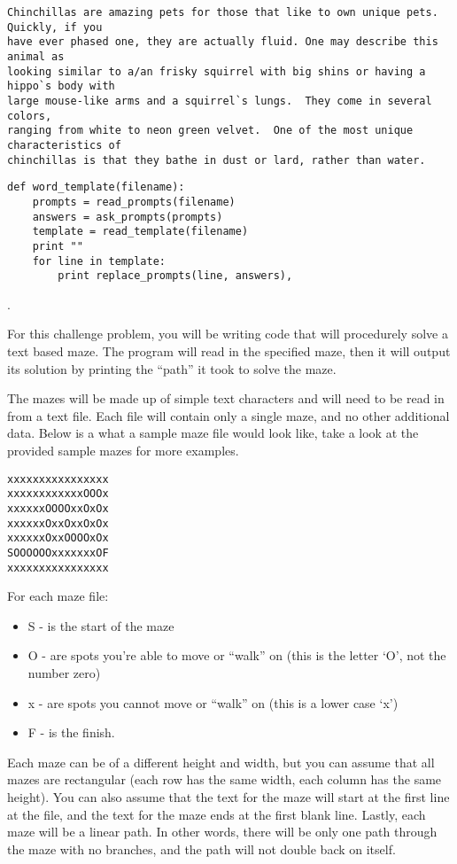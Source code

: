 \documentclass[10pt,answers]{exam}
\begin{document}
\begin{questions}
\begin{lstlisting}
Chinchillas are amazing pets for those that like to own unique pets. Quickly, if you 
have ever phased one, they are actually fluid. One may describe this animal as 
looking similar to a/an frisky squirrel with big shins or having a hippo`s body with 
large mouse-like arms and a squirrel`s lungs.  They come in several colors, 
ranging from white to neon green velvet.  One of the most unique characteristics of 
chinchillas is that they bathe in dust or lard, rather than water.
\end{lstlisting}

\begin{solution}
\begin{lstlisting}
def word_template(filename):
    prompts = read_prompts(filename)
    answers = ask_prompts(prompts)
    template = read_template(filename)
    print ""
    for line in template:
        print replace_prompts(line, answers),
\end{lstlisting}
\end{solution}

. 

For this challenge problem, you will be writing code that will procedurely solve a text based maze.  The program will read in the specified maze, then it will output its solution by printing the ``path'' it took to solve the maze.

The mazes will be made up of simple text characters and will need to be read in from a text file.  Each file will contain only a single maze, and no other additional data.  Below is a what a sample maze file would look like, take a look at the provided sample mazes for more examples.

\begin{verbatim}
xxxxxxxxxxxxxxxx
xxxxxxxxxxxxOOOx
xxxxxxOOOOxxOxOx
xxxxxxOxxOxxOxOx
xxxxxxOxxOOOOxOx
SOOOOOOxxxxxxxOF
xxxxxxxxxxxxxxxx
\end{verbatim}

For each maze file:
\begin{itemize}
    \item S - is the start of the maze
    \item O - are spots you're able to move or ``walk'' on (this is the letter `O', not the number zero)
    \item x - are spots you cannot move or ``walk'' on (this is a lower case `x')
    \item F - is the finish.
\end{itemize}
Each maze can be of a different height and width, but you can assume that all mazes are rectangular (each row has the same width, each column has the same height).  You can also assume that the text for the maze will start at the first line at the file, and the text for the maze ends at the first blank line.  Lastly, each maze will be a linear path.  In other words, there will be only one path through the maze with no branches, and the path will not double back on itself.


\end{questions}
\end{document}
